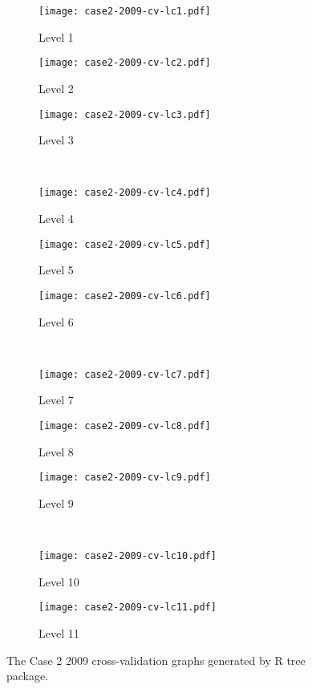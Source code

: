 \begin{appendices}
\begin{figure}[!ht] \centering
	\captionsetup[subfigure]{width=2.0in}
	\begin{subfigure}[t]{0.32\textwidth}
		\texttt{[image: case2-2009-cv-lc1.pdf]}
		\caption{Level 1}
	\end{subfigure}
	\begin{subfigure}[t]{0.32\textwidth}
		\texttt{[image: case2-2009-cv-lc2.pdf]}
		\caption{Level 2}
	\end{subfigure}
	\begin{subfigure}[t]{0.32\textwidth}
		\texttt{[image: case2-2009-cv-lc3.pdf]}
		\caption{Level 3}
	\end{subfigure}\\
	\vspace{5pt}
	\begin{subfigure}[t]{0.32\textwidth}
		\texttt{[image: case2-2009-cv-lc4.pdf]}
		\caption{Level 4}
	\end{subfigure}
	\begin{subfigure}[t]{0.32\textwidth}
		\texttt{[image: case2-2009-cv-lc5.pdf]}
		\caption{Level 5}
	\end{subfigure}
	\begin{subfigure}[t]{0.32\textwidth}
		\texttt{[image: case2-2009-cv-lc6.pdf]}
		\caption{Level 6}
	\end{subfigure}\\
	\vspace{5pt}	
	\begin{subfigure}[t]{0.32\textwidth}
		\texttt{[image: case2-2009-cv-lc7.pdf]}
		\caption{Level 7}
	\end{subfigure}
	\begin{subfigure}[t]{0.32\textwidth}
		\texttt{[image: case2-2009-cv-lc8.pdf]}
		\caption{Level 8}
	\end{subfigure}
	\begin{subfigure}[t]{0.32\textwidth}
		\texttt{[image: case2-2009-cv-lc9.pdf]}
		\caption{Level 9}
	\end{subfigure}\\
	\vspace{5pt}
	\begin{subfigure}[t]{0.32\textwidth}
		\texttt{[image: case2-2009-cv-lc10.pdf]}
		\caption{Level 10}
	\end{subfigure}
	\begin{subfigure}[t]{0.32\textwidth}
		\texttt{[image: case2-2009-cv-lc11.pdf]}
		\caption{Level 11}
	\end{subfigure}
	\vspace{5pt}
	\caption[The Case 2 2009 cross-validation graphs generated by R tree package.]{The Case 2 2009 cross-validation graphs generated by R tree package.}
	\label{fig: appendix-fig.c14.cv}
\end{figure}


\end{appendices}
